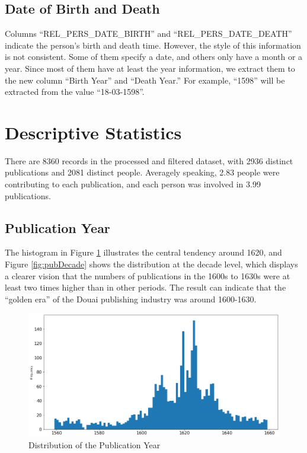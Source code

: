 \documentclass[12pt,a4paper,oneside]{book}
\begin{document}
\begin{sloppypar}
\subsection*{Date of Birth and Death}
Columns “REL\_PERS\_DATE\_BIRTH” and “REL\_PERS\_DATE\_DEATH” indicate the person’s birth and death time. However, the style of this information is not consistent. Some of them specify a date, and others only have a month or a year. Since most of them have at least the year information, we extract them to the new column “Birth Year” and “Death Year.” For example, “1598” will be extracted from the value “18-03-1598”.

\section{Descriptive Statistics}
There are 8360 records in the processed and filtered dataset, with 2936 distinct publications and 2081 distinct people. Averagely speaking, 2.83 people were contributing to each publication, and each person was involved in 3.99 publications.

\subsection*{Publication Year}
The histogram in Figure \ref{fig:pubYear} illustrates the central tendency around 1620, and Figure \ref{fig:pubDecade} shows the distribution at the decade level, which displays a clearer vision that the numbers of publications in the 1600s to 1630s were at least two times higher than in other periods. The result can indicate that the “golden era” of the Douai publishing industry was around 1600-1630.

\begin{figure}[H]
\centering
\includegraphics[scale=0.4]{graph/Distribution of the Publication Year.png}
\caption{Distribution of the Publication Year}
\label{fig:pubYear}
\end{figure}


\end{sloppypar}
\end{document}
